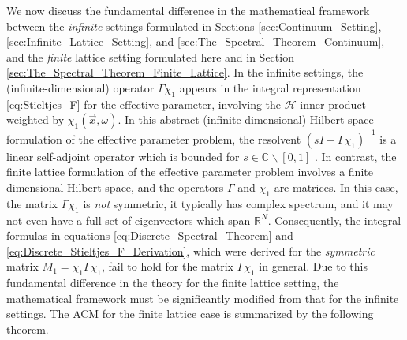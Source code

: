 \documentclass{cmslatex}
\begin{document}
We now discuss the fundamental difference in the mathematical
framework between the \emph{infinite}
settings formulated in Sections \ref{sec:Continuum_Setting},
\ref{sec:Infinite_Lattice_Setting}, and
\ref{sec:The_Spectral_Theorem_Continuum}, and the \emph{finite}
lattice setting formulated here and in Section
\ref{sec:The_Spectral_Theorem_Finite_Lattice}. In the infinite
settings, the (infinite-dimensional) operator $\Gamma\chi_1$ appears in the integral
representation \eqref{eq:Stieltjes_F} for the effective parameter,
involving the $\mathscr{H}$-inner-product 
weighted by $\chi_1(\vec{x},\omega)$. In this abstract (infinite-dimensional)
Hilbert space formulation of the effective parameter problem, the
resolvent $(sI-\Gamma\chi_1)^{-1}$ is a linear self-adjoint operator which is
bounded for $s\in\mathbb{C}\backslash[0,1]$ \cite{Stone:64}. In contrast, the
finite lattice formulation of the effective parameter problem involves
a finite dimensional Hilbert space, and the operators $\Gamma$ and $\chi_1$
are matrices. In this case, the matrix $\Gamma\chi_1$ is \emph{not} symmetric,
it typically has complex spectrum, and it may not even have a full set
of eigenvectors which span $\mathbb{R}^N$. Consequently, the integral
formulas in equations \eqref{eq:Discrete_Spectral_Theorem} and
\eqref{eq:Discrete_Stieltjes_F_Derivation}, which were derived for the
\emph{symmetric} matrix $M_1=\chi_1\Gamma\chi_1$, fail to hold for the matrix
$\Gamma\chi_1$ in general. Due to this fundamental difference in the theory
for the finite lattice setting, the mathematical framework must be 
significantly modified from that for the infinite settings. The ACM
for the finite lattice case is summarized by the following theorem.
\end{document}
